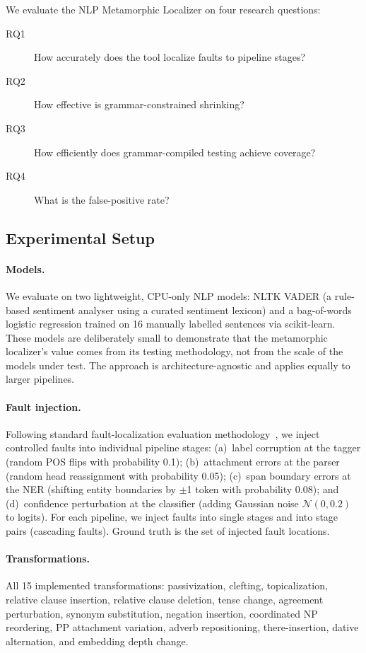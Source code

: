 \documentclass[sigconf,nonacm]{acmart}
\begin{document}
We evaluate the NLP Metamorphic Localizer on four research questions:
\begin{description}
    \item[RQ1] How accurately does the tool localize faults to pipeline stages?
    \item[RQ2] How effective is grammar-constrained shrinking?
    \item[RQ3] How efficiently does grammar-compiled testing achieve coverage?
    \item[RQ4] What is the false-positive rate?
\end{description}

\subsection{Experimental Setup}

\paragraph{Models.}
We evaluate on two lightweight, CPU-only NLP models: NLTK VADER (a rule-based sentiment analyser using a curated sentiment lexicon) and a bag-of-words logistic regression trained on 16 manually labelled sentences via scikit-learn.
These models are deliberately small to demonstrate that the metamorphic localizer's value comes from its testing methodology, not from the scale of the models under test.
The approach is architecture-agnostic and applies equally to larger pipelines.

\paragraph{Fault injection.}
Following standard fault-localization evaluation methodology~\cite{wong2016survey}, we inject controlled faults into individual pipeline stages: (a)~label corruption at the tagger (random POS flips with probability 0.1); (b)~attachment errors at the parser (random head reassignment with probability 0.05); (c)~span boundary errors at the NER (shifting entity boundaries by $\pm$1 token with probability 0.08); and (d)~confidence perturbation at the classifier (adding Gaussian noise $\mathcal{N}(0, 0.2)$ to logits).
For each pipeline, we inject faults into single stages and into stage pairs (cascading faults).
Ground truth is the set of injected fault locations.

\paragraph{Transformations.}
All 15 implemented transformations: passivization, clefting, topicalization, relative clause insertion, relative clause deletion, tense change, agreement perturbation, synonym substitution, negation insertion, coordinated NP reordering, PP attachment variation, adverb repositioning, there-insertion, dative alternation, and embedding depth change.
\end{document}
